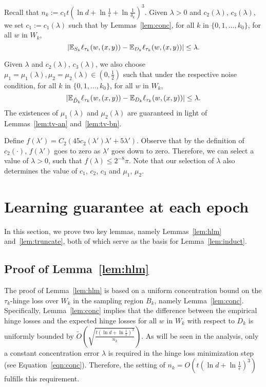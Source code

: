 Recall that $n_k := c_1 t (\ln d + \ln \frac 1 \epsilon + \ln \frac{1}{\delta_k})^3$. Given $\lambda > 0$ and $c_2(\lambda)$, $c_3(\lambda)$, we set $c_1:=c_1(\lambda)$ such that by Lemmas~\ref{lem:conc}, for all $k$ in $\{0,1,\ldots,k_0\}$, for all $w$ in $W_k$,
\begin{equation}
 |\mathbb{E}_{S_k} \ell_{\tau_k}(w, (x, y)) - \mathbb{E}_{D_k} \ell_{\tau_k}(w, (x, y))| \leq \lambda.
\label{eqn:conc}
\end{equation}

Given $\lambda$ and $c_2(\lambda)$, $c_3(\lambda)$, we also choose $\mu_1 = \mu_1(\lambda), \mu_2 = \mu_2(\lambda) \in (0,\frac 1 2)$ such that under the respective noise condition, for all $k$ in $\{0,1,\ldots,k_0\}$, for all $w$ in $W_k$,
\begin{equation}
| \mathbb{E}_{\tilde{D}_k} \ell_{\tau_k}(w, (x, y)) - \mathbb{E}_{D_k} \ell_{\tau_k}(w, (x, y))| \leq \lambda.
\label{eqn:corrupt}
\end{equation}
The existences of $\mu_1(\lambda)$ and $\mu_2(\lambda)$ are guaranteed in light of Lemmas~\ref{lem:tv-an} and~\ref{lem:tv-bn}.

Define $f(\lambda') = C_2(45 c_2(\lambda') \lambda' + 5\lambda')$. Observe that by the definition of $c_2(\cdot)$, $f(\lambda')$ goes to zero as $\lambda'$ goes down to zero. Therefore, we can select a value of $\lambda > 0$, such that $f(\lambda) \leq 2^{-8} \pi$.
Note that our selection of $\lambda$ also determines the value of $c_1$, $c_2$, $c_3$ and $\mu_1$, $\mu_2$.

\section{Learning guarantee at each epoch}
\label{sec:epoch}
In this section, we prove two key lemmas, namely
Lemmas~\ref{lem:hlm} and~\ref{lem:truncate}, both of which serve as the basis for Lemma~\ref{lem:induct}.

\subsection{Proof of Lemma~\ref{lem:hlm}}
The proof of Lemma~\ref{lem:hlm} is based on
a uniform concentration bound on the $\tau_k$-hinge loss over $W_k$ in the sampling region $B_k$, namely Lemma~\ref{lem:conc}.
Specifically, Lemma~\ref{lem:conc} implies that the
difference between the empirical hinge losses and the expected hinge losses for all $w$ in $W_k$ with respect to $D_k$ is uniformly bounded by $\tilde{O}(\sqrt{\frac{t (\ln d + \ln \frac 1 \epsilon)^3}{n_k}})$.
As will be seen in the analysis, only a constant concentration error $\lambda$ is required in the hinge loss minimization step (see Equation~\eqref{eqn:conc}). Therefore, the setting of $n_k = O(t (\ln d + \ln \frac 1 \epsilon)^3)$ fulfills this requirement.


